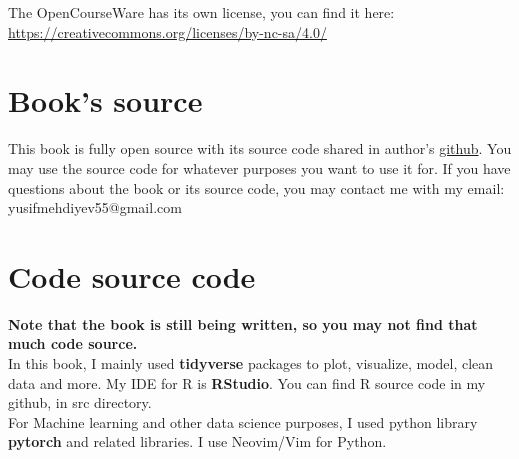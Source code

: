 The OpenCourseWare has its own license, you can find it here: \url{https://creativecommons.org/licenses/by-nc-sa/4.0/}


\section*{Book's source}
This book is fully open source with its source code shared in author's \href{https://github.com/JosephMehdiyev}{github}. You may use the source code for whatever purposes you want to use it for. If you have questions about the book or its source code, you may contact me with my email: yusifmehdiyev55@gmail.com 


\section*{Code source code}
\textbf{Note that the book is still being written, so you may not find that much code source.}\\
In this book, I mainly used \textbf{tidyverse} packages to plot, visualize, model, clean data and more. My IDE for R is \textbf{RStudio}. You can find R source code in my github, in src directory.
\\
For Machine learning and other data science purposes, I used python library \textbf{pytorch} and related libraries. I use Neovim/Vim for Python.
